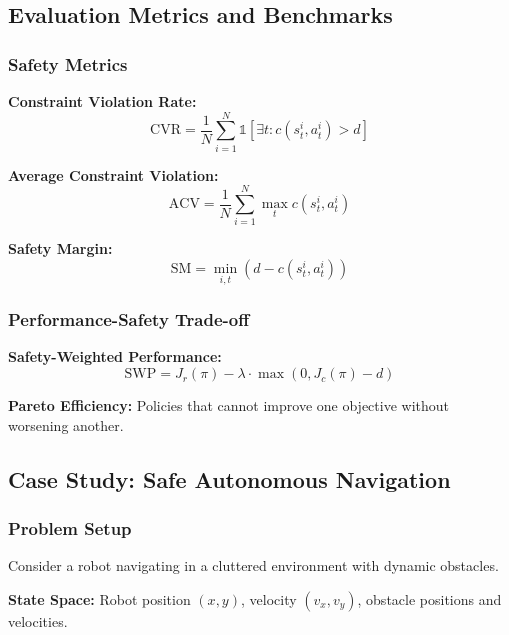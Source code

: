 \documentclass[12pt]{article}
\begin{document}
{{{{\subsection{Evaluation Metrics and Benchmarks}

\subsubsection{Safety Metrics}

\textbf{Constraint Violation Rate:}
\begin{equation}
\text{CVR} = \frac{1}{N} \sum_{i=1}^{N} \mathbb{1}[\exists t: c(s_t^i, a_t^i) > d]
\end{equation}

\textbf{Average Constraint Violation:}
\begin{equation}
\text{ACV} = \frac{1}{N} \sum_{i=1}^{N} \max_t c(s_t^i, a_t^i)
\end{equation}

\textbf{Safety Margin:}
\begin{equation}
\text{SM} = \min_{i,t} (d - c(s_t^i, a_t^i))
\end{equation}

\subsubsection{Performance-Safety Trade-off}

\textbf{Safety-Weighted Performance:}
\begin{equation}
\text{SWP} = J_r(\pi) - \lambda \cdot \max(0, J_c(\pi) - d)
\end{equation}

\textbf{Pareto Efficiency:} Policies that cannot improve one objective without worsening another.

\subsection{Case Study: Safe Autonomous Navigation}

\subsubsection{Problem Setup}

Consider a robot navigating in a cluttered environment with dynamic obstacles.

\textbf{State Space:} Robot position $(x, y)$, velocity $(v_x, v_y)$, obstacle positions and velocities.

}}}}
\end{document}
